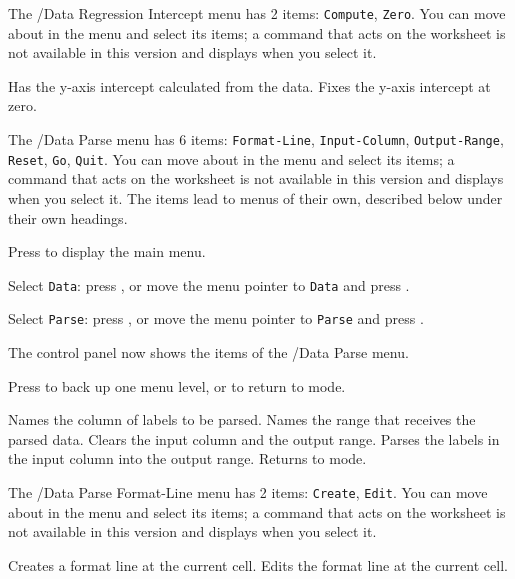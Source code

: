 The /Data Regression Intercept menu has 2 items: \texttt{Compute}, \texttt{Zero}.  You can move about in the menu and select its items; a command that acts on the worksheet is not available in this version and displays  when you select it.
\begin{Options}
 Has the y-axis intercept calculated from the data.
 Fixes the y-axis intercept at zero.
\end{Options}

The /Data Parse menu has 6 items: \texttt{Format-Line}, \texttt{Input-Column}, \texttt{Output-Range}, \texttt{Reset}, \texttt{Go}, \texttt{Quit}.  You can move about in the menu and select its items; a command that acts on the worksheet is not available in this version and displays  when you select it.
The items  lead to menus of their own, described below under their own headings.
\begin{Steps123}
\item Press  to display the main menu.
\item Select \texttt{Data}: press , or move the menu pointer to \texttt{Data} and press .
\item Select \texttt{Parse}: press , or move the menu pointer to \texttt{Parse} and press .
\item The control panel now shows the items of the /Data Parse menu.
\item Press  to back up one menu level, or  to return to  mode.
\end{Steps123}
\begin{Options}
 Names the column of labels to be parsed.
 Names the range that receives the parsed data.
 Clears the input column and the output range.
 Parses the labels in the input column into the output range.
 Returns to  mode.
\end{Options}

The /Data Parse Format-Line menu has 2 items: \texttt{Create}, \texttt{Edit}.  You can move about in the menu and select its items; a command that acts on the worksheet is not available in this version and displays  when you select it.
\begin{Options}
 Creates a format line at the current cell.
 Edits the format line at the current cell.
\end{Options}
